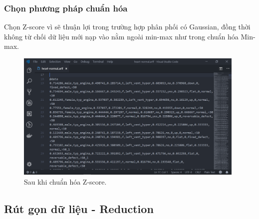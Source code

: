 \subsubsection{Chọn phương pháp chuẩn hóa}
Chọn Z-score vì sẽ thuận lợi trong trường hợp phân phối có Gaussian, đồng thời không từ chối dữ liệu mới nạp vào nằm ngoài min-max như trong chuẩn hóa Min-max.
\begin{figure}[H]
\centering
\includegraphics[width=0.98\textwidth]{5/f.png}
\caption{Sau khi chuẩn hóa Z-score.}
\end{figure}

\subsection{Rút gọn dữ liệu - Reduction}
